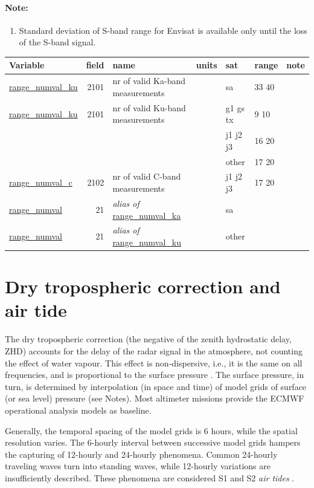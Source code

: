 \documentclass[a4paper,11pt,openany,natbib,nomargin]{thesis}
\makeatletter
\newcommand\var[1]{\url{#1}\index{variables!#1@\protect\url{#1}}}
\newcommand\alias[1]{\emph{alias of} \var{#1}}
\newenvironment{vartable}{
\begin{table}[ht]
\small
\begin{tabular}{lrllllr}
\hline
Variable & field & name & units & sat & range & note \\
\hline
}{
\hline
\end{tabular}
\end{table}
}
\newenvironment{notes}[1][Notes:]{\FloatBarrier\paragraph{#1}\begin{enumerate}}{\end{enumerate}}
\makeatother
\begin{document}
\begin{notes}[Note:]
\item Standard deviation of S-band range for Envisat is available only until the loss of the S-band signal.\label{item:range_rms_s}
\end{notes}

\begin{vartable}
\var{range_numval_ku} & 2101 & nr of valid Ka-band measurements && sa & 33 40 & \\
\var{range_numval_ku} & 2101 & nr of valid Ku-band measurements && g1 gs tx & 9 10 & \\
                      &      &                                      && j1 j2 j3 & 16 20 & \\
                      &      &                                      && other & 17 20 & \\
\var{range_numval_c} & 2102 & nr of valid C-band measurements && j1 j2 j3 & 17 20 & \\
\hline
\var{range_numval} &   21 & \alias{range_numval_ka} && sa && \\
\var{range_numval} &   21 & \alias{range_numval_ku} && other && \\
\end{vartable}

\section{Dry tropospheric correction and air tide}
\label{var:dry_tropo}
The dry tropospheric correction (the negative of the zenith hydrostatic delay, ZHD) accounts for the delay of the radar signal in the atmosphere, not counting the effect of water vapour. This effect is non-dispersive, i.e., it is the same on all frequencies, and is proportional to the surface pressure \citep{saastamoinen1972}. The surface pressure, in turn, is determined by interpolation (in space and time) of model grids of surface (or sea level) pressure (see Notes). Most altimeter missions provide the ECMWF operational analysis models as baseline.

Generally, the temporal spacing of the model grids is 6 hours, while the spatial resolution varies. The 6-hourly interval between successive model grids hampers the capturing of 12-hourly and 24-hourly phenomena. Common 24-hourly traveling waves turn into standing waves, while 12-hourly variations are insufficiently described. These phenomena are considered S1 and S2 \emph{air tides} \citep{ponte2002}.
\end{document}
